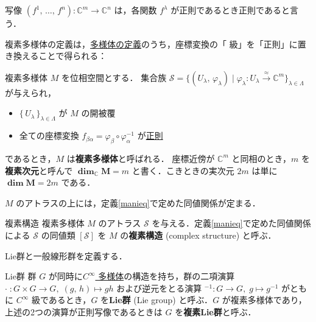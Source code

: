 \documentclass[geometry_main]{subfiles}
\begin{document}
写像 $(f^1,\, \dots,\, f^n) \colon \mathbb{C}^m \to \mathbb{C}^n$ は，各関数 $f^\lambda$ が正則であるとき正則であると言う．

複素多様体の定義は，\hyperref[diffmani]{\cinfty 多様体の定義}のうち，座標変換の「 \cinfty 級」を「正則」に置き換えることで得られる：

\begin{mydef}[label=def.complexmani]{複素多様体}
	$M$ を位相空間とする．
	集合族 $\mathcal{S} = \{(U_\lambda,\, \varphi_\lambda)\mid \varphi_\lambda \colon U_\lambda \xrightarrow{\approx} \mathbb{C}^m \}_{\lambda \in \Lambda}$ が与えられ，
	\begin{itemize}
		\item $\{\, U_\lambda \, \}_{\lambda \in \Lambda}$ が $M$ の開被覆
		\item 全ての座標変換 $f_{\beta\alpha} = \varphi_{\beta} \circ \varphi_{\alpha}^{-1}$ が\underline{正則}
	\end{itemize}
	であるとき，$M$ は\textbf{複素多様体}と呼ばれる．
	\tcblower
	座標近傍が $\mathbb{C}^m$ と同相のとき，$m$ を\textbf{複素次元}と呼んで $\bm{\dim_{\mathbb{C}} M} = m$ と書く．こきときの実次元 $2m$ は単に $\bm{\dim M} = 2m$ である．
\end{mydef}

$M$ のアトラスの上には，定義\ref{manieq}で定めた同値関係が定まる．

\begin{mydef}[label=complex_structure]{複素構造}
	複素多様体 $M$ のアトラス $\mathcal{S}$ を与える．定義\ref{manieq}で定めた同値関係による $\mathcal{S}$ の同値類 $[\mathcal{S}]$ を $M$ の\textbf{複素構造} (complex structure) と呼ぶ．
\end{mydef}

Lie群と一般線形群を定義する．
\begin{mydef}[label=def.Liegroup]{Lie群}
	群 $G$ が同時に\hyperref[diffmani]{$C^\infty$ 多様体}の構造を持ち，群の二項演算 $\cdot\; \colon G\times G \to G,\; (g,\, h) \mapsto gh$ および逆元をとる演算 ${}^{-1} \colon G\to G ,\; g \mapsto g^{-1}$ がともに $C^\infty$ 級であるとき，$G$ を\textbf{Lie群} (Lie group) と呼ぶ．$G$ が複素多様体であり，上述の2つの演算が正則写像であるときは $G$ を\textbf{複素Lie群}と呼ぶ．
\end{mydef}
\end{document}
